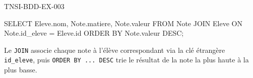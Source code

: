 \begin{corrige}{TNSI-BDD-EX-003}
\begin{sql}
SELECT Eleve.nom, Note.matiere, Note.valeur
FROM Note
JOIN Eleve ON Note.id_eleve = Eleve.id
ORDER BY Note.valeur DESC;
\end{sql}
Le \texttt{JOIN} associe chaque note à l'élève correspondant via la clé étrangère \texttt{id\_eleve}, puis \texttt{ORDER BY ... DESC} trie le résultat de la note la plus haute à la plus basse.
\end{corrige}
